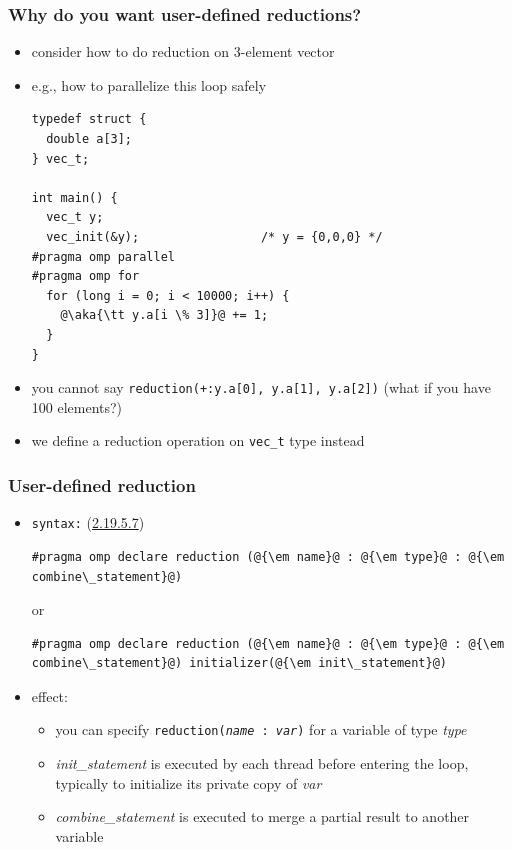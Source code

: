 \documentclass[12pt,dvipdfmx]{beamer}
\newcommand{\sectionompdeclarereduction}{{\href{https://www.openmp.org/spec-html/5.0/openmpsu107.html\#x140-5800002.19.5}{2.19.5.7}}}
\newcommand{\ao}[1]{{\color{blue}#1}}
\newcommand{\aka}[1]{{\color{red}#1}}
\begin{document}
\begin{frame}[fragile]
  \frametitle{Why do you want user-defined reductions?}
  \begin{itemize}
  \item consider how to do reduction on 3-element vector
  \item e.g., how to parallelize this loop safely
\begin{lstlisting}
typedef struct {
  double a[3];
} vec_t;

int main() {
  vec_t y;
  vec_init(&y);                 /* y = {0,0,0} */
#pragma omp parallel
#pragma omp for
  for (long i = 0; i < 10000; i++) {
    @\aka{\tt y.a[i \% 3]}@ += 1;
  }
}
\end{lstlisting}
\item you cannot say \aka{\tt reduction(+:y.a[0], y.a[1], y.a[2])}
  (what if you have 100 elements?)
  
\item we define a reduction operation on {\tt vec\_t} type instead
\end{itemize}
\end{frame}

\begin{frame}[fragile]
\frametitle{User-defined reduction}
\begin{itemize}
\item \ao{\tt syntax:} (\sectionompdeclarereduction)
\begin{lstlisting}
#pragma omp declare reduction (@{\em name}@ : @{\em type}@ : @{\em combine\_statement}@)
\end{lstlisting}
or
\begin{lstlisting}
#pragma omp declare reduction (@{\em name}@ : @{\em type}@ : @{\em combine\_statement}@) initializer(@{\em init\_statement}@)
\end{lstlisting}

\item \ao{effect:}
  \begin{itemize}
  \item you can specify {\tt reduction({\it name} : {\it var})}
    for a variable of type {\it type}
  \item {\it init\_statement} is executed by each thread before entering the loop, typically to initialize its private copy of {\it var}
  \item {\it combine\_statement} is executed
    to merge a partial result to another variable
  \end{itemize}
\end{itemize}
\end{frame}
\end{document}

